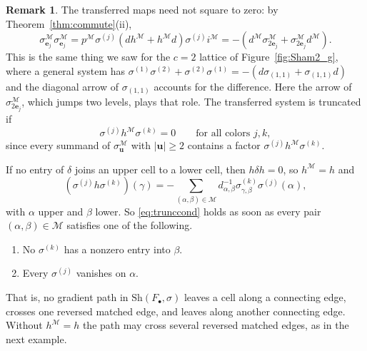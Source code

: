 \documentclass[12pt]{amsart}
\theoremstyle{plain}
\theoremstyle{definition}
\newtheorem{remark}[theorem]{Remark}
\newcommand{\F}{ {F_\bullet} }
\newcommand{\M}{\mathcal{M}}
\newcommand{\Sh}{\mathrm{Sh}}
\begin{document}
\begin{remark}\label{rem:defect}
    The transferred maps need not square to zero: by Theorem~\ref{thm:commute}(ii),
    \[
        \sigma^{\M}_{\boldsymbol{e}_j} \sigma^{\M}_{\boldsymbol{e}_j} = p^{\M} \sigma^{(j)} (d h^{\M} + h^{\M} d) \sigma^{(j)} i^{\M} = -(d^{\M} \sigma^{\M}_{2\boldsymbol{e}_j} + \sigma^{\M}_{2\boldsymbol{e}_j} d^{\M}).
    \]
    This is the same thing we saw for the $c = 2$ lattice of Figure~\ref{fig:Sham2_g}, where a general system has $\sigma^{(1)}\sigma^{(2)} + \sigma^{(2)}\sigma^{(1)} = -(d\sigma_{(1,1)} + \sigma_{(1,1)}d)$ and the diagonal arrow of $\sigma_{(1,1)}$ accounts for the difference. Here the arrow of $\sigma^{\M}_{2\boldsymbol{e}_j}$, which jumps two levels, plays that role.
    The transferred system is truncated if
    \begin{equation}\label{eq:trunccond}
        \sigma^{(j)} h^{\M} \sigma^{(k)} = 0 \qquad \text{for all colors } j, k,
    \end{equation}
    since every summand of $\sigma^{\M}_{\boldsymbol{u}}$ with $|\boldsymbol{u}| \ge 2$ contains a factor $\sigma^{(j)} h^{\M} \sigma^{(k)}$.

    If no entry of $\delta$ joins an upper cell to a lower cell, then $h \delta h = 0$, so $h^{\M} = h$ and
    \[
        (\sigma^{(j)} h \sigma^{(k)})(\gamma) = -\sum_{(\alpha, \beta) \in \M} d_{\alpha,\beta}^{-1} \sigma^{(k)}_{\gamma,\beta} \sigma^{(j)}(\alpha),
    \]
    with $\alpha$ upper and $\beta$ lower. So \eqref{eq:trunccond} holds as soon as every pair $(\alpha, \beta) \in \M$ satisfies one of the following.
    \begin{enumerate}[label=(\arabic*),leftmargin=*,itemsep=1pt]
        \item No $\sigma^{(k)}$ has a nonzero entry into $\beta$.
        \item Every $\sigma^{(j)}$ vanishes on $\alpha$.
    \end{enumerate}
    That is, no gradient path in $\Sh(\F, \sigma)$ leaves a cell along a connecting edge, crosses one reversed matched edge, and leaves along another connecting edge. Without $h^{\M} = h$ the path may cross several reversed matched edges, as in the next example.
\end{remark}
\end{document}
